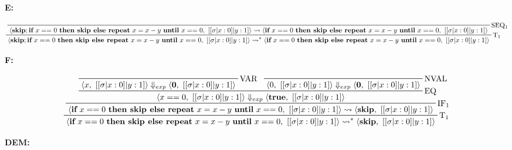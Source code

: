 \documentclass[11pt]{article}
\newcommand{\curly}{\mathrel{\leadsto}}
\begin{document}
\begin{landscape}
\textbf{E:}

\begin{displaymath}
    \prftree[r]{$\mathrm{T_1}$}{
        \prftree[r]{$\mathrm{SEQ_1}$}
        {\langle \textbf{skip}; \textbf{if}\ x==0\ \textbf{then\ skip\ else\ repeat}\ x=x-y\ \textbf{until}\ x==0,\ [[\sigma|x:0]|y:1] \rangle \curly \langle \textbf{if}\ x==0\ \textbf{then\ skip\ else\ repeat}\ x=x-y\ \textbf{until}\ x==0,\ [[\sigma|x:0]|y:1] \rangle}
    }
    {\langle \textbf{skip}; \textbf{if}\ x==0\ \textbf{then\ skip\ else\ repeat}\ x=x-y\ \textbf{until}\ x==0,\ [[\sigma|x:0]|y:1] \rangle \curly^* \langle \textbf{if}\ x==0\ \textbf{then\ skip\ else\ repeat}\ x=x-y\ \textbf{until}\ x==0,\ [[\sigma|x:0]|y:1] \rangle}
\end{displaymath}

\textbf{F:}

\begin{displaymath}
    \prftree[r]{$\mathrm{T_1}$}{
        \prftree[r]{$\mathrm{IF_1}$}{
            \prftree[r]{$\mathrm{EQ}$}{
                \prftree[r]{$\mathrm{VAR}$}
                {\langle x,\ [[\sigma|x:0]|y:1] \rangle \Downarrow_{exp} \langle \textbf{0},\ [[\sigma|x:0]|y:1] \rangle}
            }{
                \prftree[r]{$\mathrm{NVAL}$}
                {\langle 0,\ [[\sigma|x:0]|y:1] \rangle \Downarrow_{exp} \langle \textbf{0},\ [[\sigma|x:0]|y:1] \rangle}
            }
            {\langle x==0,\ [[\sigma|x:0]|y:1] \rangle \Downarrow_{exp} \langle \textbf{true},\ [[\sigma|x:0]|y:1] \rangle}
        }
        {\langle \textbf{if}\ x==0\ \textbf{then\ skip\ else\ repeat}\ x=x-y\ \textbf{until}\ x==0,\ [[\sigma|x:0]|y:1] \rangle \curly \langle \textbf{skip},\ [[\sigma|x:0]|y:1] \rangle}
    }
    {\langle \textbf{if}\ x==0\ \textbf{then\ skip\ else\ repeat}\ x=x-y\ \textbf{until}\ x==0,\ [[\sigma|x:0]|y:1] \rangle \curly^* \langle \textbf{skip},\ [[\sigma|x:0]|y:1] \rangle}
\end{displaymath}

\textbf{DEM:}


\end{landscape}
\end{document}
